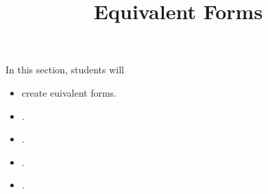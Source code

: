 \documentclass{ximera}
\title{Equivalent Forms}
\begin{document}
\begin{abstract}
\end{abstract}
\maketitle



















\begin{sectionOutcomes}
In this section, students will 

\begin{itemize}
\item create euivalent forms.
\item .
\item .
\item .
\item .
\end{itemize}
\end{sectionOutcomes}
\end{document}
